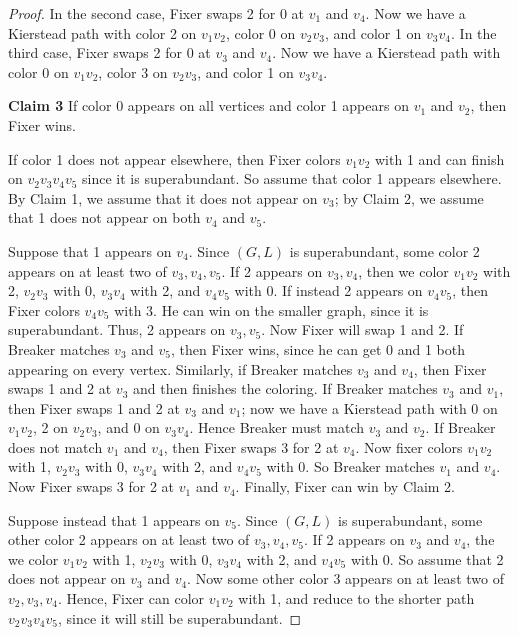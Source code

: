 \documentclass[12pt,reqno]{amsart}
\theoremstyle{plain}
\theoremstyle{definition}
\theoremstyle{remark}
\begin{document}
\begin{proof}
In the second case, Fixer swaps 2 for 0 at $v_1$ and $v_4$.  Now we have a
Kierstead path with color 2 on $v_1v_2$, color 0 on $v_2v_3$, and color 1 on
$v_3v_4$.
In the third case, Fixer swaps 2 for 0 at $v_3$ and $v_4$.  Now we have a
Kierstead path with color 0 on $v_1v_2$, color 3 on $v_2v_3$, and color 1 on
$v_3v_4$.
\smallskip

\noindent
\textbf{Claim 3}
If color 0 appears on all vertices and color 1 appears on $v_1$ and $v_2$, then
Fixer wins.

If color 1 does not appear elsewhere, then Fixer colors $v_1v_2$ with 1 and can
finish on $v_2v_3v_4v_5$ since it is superabundant.  So assume that color 1
appears elsewhere.  By Claim 1, we assume that it does not appear on $v_3$;
by Claim 2, we assume that 1 does not appear on both $v_4$ and $v_5$.  

Suppose
that 1 appears on $v_4$.  Since $(G,L)$ is superabundant, some color 2 appears
on at least two of $v_3,v_4,v_5$.  If 2 appears on $v_3,v_4$, then we color
$v_1v_2$ with 2, $v_2v_3$ with 0, $v_3v_4$ with 2, and $v_4v_5$ with 0.  If
instead 2 appears on $v_4v_5$, then Fixer colors $v_4v_5$ with 3.  He can win
on the smaller graph, since it is superabundant.  Thus, 2 appears on $v_3, v_5$.
Now Fixer will swap 1 and 2.  If Breaker matches $v_3$ and $v_5$, then Fixer
wins, since he can get 0 and 1 both appearing on every vertex.  Similarly, if
Breaker matches $v_3$ and $v_4$, then Fixer swaps 1 and 2 at $v_3$ and then
finishes the coloring.  If Breaker matches $v_3$ and $v_1$, then Fixer swaps 1
and 2 at $v_3$ and $v_1$; now we have a Kierstead path with 0 on $v_1v_2$, 2 on
$v_2v_3$, and 0 on $v_3v_4$.  Hence Breaker must match $v_3$ and $v_2$.  If
Breaker does not match $v_1$ and $v_4$, then Fixer swaps 3 for 2 at $v_4$.
Now fixer colors $v_1v_2$ with 1, $v_2v_3$ with 0, $v_3v_4$ with 2, and $v_4v_5$
with 0.  So Breaker matches $v_1$ and $v_4$.  Now Fixer swaps 3 for 2 at $v_1$
and $v_4$.  Finally, Fixer can win by Claim 2.

Suppose instead that 1 appears on $v_5$.  Since $(G,L)$ is superabundant, some
other color 2 appears on at least two of $v_3, v_4, v_5$.  If 2 appears on $v_3$
and $v_4$, the we color $v_1v_2$ with 1, $v_2v_3$ with 0, $v_3v_4$ with 2, and
$v_4v_5$ with 0.  So assume that 2 does not appear on $v_3$ and $v_4$.  Now some
other color 3 appears on at least two of $v_2,v_3,v_4$.  Hence, Fixer can color
$v_1v_2$ with 1, and reduce to the shorter path $v_2v_3v_4v_5$, since it will
still be superabundant.
\smallskip


\end{proof}
\end{document}
